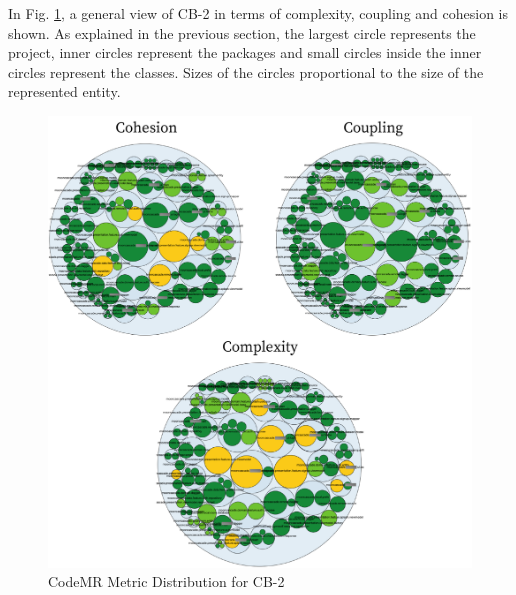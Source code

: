 \newpage
In Fig. \ref{fig:CB-2-package}, a general view of CB-2 in terms of complexity, coupling and cohesion is shown. As explained in the previous section, the largest circle represents the project, inner circles represent the packages and small circles inside the inner circles represent the classes. Sizes of the circles proportional to the size of the represented entity.
\begin{figure}[ht!]
    \centering
    \includegraphics[scale=1.1]{figures/CB-2-package.png}
    \caption{CodeMR Metric Distribution for CB-2}
    \label{fig:CB-2-package}
\end{figure}
\FloatBarrier





